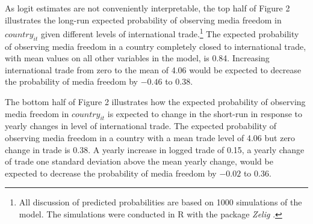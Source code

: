 \documentclass[12pt,a4paper]{article}\usepackage[]{graphicx}\usepackage[]{color}
\begin{document}
As logit estimates are not conveniently interpretable, the top half of Figure 2 illustrates the long-run expected probability of observing media freedom in $country_{it}$ given different levels of international trade.\footnote{All discussion of predicted probabilities are based on 1000 simulations of the model. The simulations were conducted in R with the package \emph{Zelig} \parencite*{ZeligEveryonesSt:2009ts}.} The expected probability of observing media freedom in a country completely closed to international trade, with mean values on all other variables in the model, is 0.84. Increasing international trade from zero to the mean of 4.06 would be expected to decrease the probability of media freedom by \ensuremath{-0.46} to 0.38.

The bottom half of Figure 2 illustrates how the expected probability of observing media freedom in $country_{it}$ is expected to change in the short-run in response to yearly changes in level of international trade. The expected probability of observing media freedom in a country with a mean trade level of 4.06 but zero change in trade is 0.38. A yearly increase in logged trade of 0.15, a yearly change of trade one standard deviation above the mean yearly change, would be expected to decrease the probability of media freedom by \ensuremath{-0.02} to 0.36.


% 
% 
% 
\end{document}
